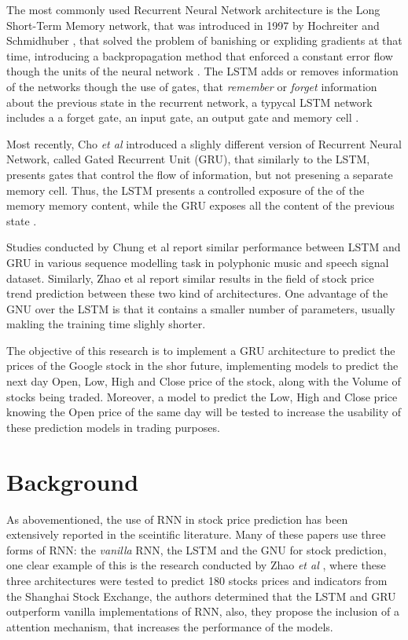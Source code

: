 \documentclass[10pt,twocolumn,letterpaper]{article}
\begin{document}
The most commonly used Recurrent Neural Network architecture is the Long Short-Term Memory network, that was introduced in 1997 by Hochreiter and Schmidhuber \cite{Hochreiter1997}, that solved the problem of banishing or expliding gradients at that time, introducing a backpropagation method that enforced a constant error flow though the units of the neural network \cite{Hochreiter1997}. The LSTM adds or removes information of the networks though the use of gates, that \textit{remember} or \textit{forget} information about the previous state in the recurrent network, a typycal LSTM network includes a  a forget gate, an input gate, an output gate and memory cell \cite{Chung2014}. 

Most recently, Cho \textit{et al} \cite{Cho2014} introduced a slighly different version of Recurrent Neural Network, called Gated Recurrent Unit (GRU), that similarly to the LSTM, presents gates that control the flow of information, but not presening a separate memory cell. Thus, the LSTM presents a controlled exposure of the of the memory memory content, while the GRU exposes all the content of the previous state \cite{Chung2014}.

Studies conducted by Chung et al \cite{Chung2014} report similar performance between LSTM and GRU in various sequence modelling task in polyphonic music and speech signal dataset. Similarly, Zhao et al \cite{Zhao2020} report similar results in the field of stock price trend prediction between these two kind of architectures. One advantage of the GNU over the LSTM is that it contains a smaller number of parameters\cite{Chung2014}, usually makling the training time slighly shorter.

The objective of this research is to implement a GRU architecture to predict the prices of the Google stock in the shor future, implementing models to predict the next day Open, Low, High and Close price of the stock, along with the Volume of stocks being traded. Moreover, a model to predict the Low, High and Close price knowing the Open price of the same day will be tested to increase the usability of these prediction models in trading purposes.



\section{Background}

As abovementioned, the use of RNN in stock price prediction has been extensively reported in the sceintific literature. Many of these papers use three forms of RNN: the \textit{vanilla} RNN, the LSTM and the GNU for stock prediction, one clear example of this is the research conducted by Zhao \textit{et al} \cite{Zhao2020}, where these three architectures were tested to predict 180 stocks prices and indicators from the Shanghai Stock Exchange, the authors determined that the LSTM and GRU outperform vanilla implementations of RNN, also, they propose the inclusion of a attention mechanism, that increases the performance of the models.
\end{document}
